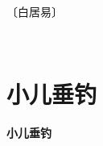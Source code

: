 \documentclass[12pt,UTF-8,openany,fontset=none]{ctexbook}
\begin{document}
\begin{center}
    \vspace{10pt}
    
    \begin{large}
        
        〔白居易〕
        
    \end{large}
    
    \vspace{8pt}
    
    \begin{huge}
        
        \phantom{。}

        \phantom{。}
        
        \phantom{。}~~

        \phantom{。}
        
        \phantom{。}

        \phantom{。}
        
        \phantom{。}

        \phantom{。}
        
    \end{huge}
    
\end{center}

\vspace{8pt}
\clearpage


\section{小儿垂钓}



\begin{center}
    {\bfseries 小儿垂钓}
\end{center}
\end{document}
